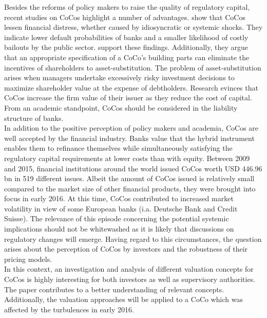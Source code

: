 Besides the reforms of policy makers to raise the quality of regulatory capital, recent studies on CoCos highlight a number of advantages. \citet{albul2015contingent} show that CoCos lessen financial distress, whether caused by idiosyncratic or systemic shocks. They indicate lower default probabilities of banks and a smaller likelihood of costly bailouts by the public sector. \citet{hilscher2014bank} support these findings. Additionally, they argue that an appropriate specification of a CoCo's building parts can eliminate the incentives of shareholders to asset-substitution. The problem of asset-substitution arises when managers undertake excessively risky investment decisions to maximize shareholder value at the expense of debtholders. \citep{bannier2010} Research evinces that CoCos increase the firm value of their issuer as they reduce the cost of capital. \citep{albul2015contingent, von2011contingent, barucci2012countercyclical} From an academic standpoint, CoCos should be considered in the liability structure of banks.\\ 

In addition to the positive perception of policy makers and academia, CoCos are well accepted by the financial industry. Banks value that the hybrid instrument enables them to refinance themselves while simultaneously satisfying the regulatory capital requirements at lower costs than with equity. \citep{europeanparliament2016} Between 2009 and 2015, financial institutions around the world issued CoCos worth USD 446.96 bn in 519 different issues. \citep{avdjiev2015coco} Albeit the amount of CoCos issued is relatively small compared to the market size of other financial products, they were brought into focus in early 2016. At this time, CoCos contributed to increased market volatility in view of some European banks (i.a. Deutsche Bank and Credit Suisse). The relevance of this episode concerning the potential systemic implications should not be whitewashed as it is likely that discussions on regulatory changes will emerge. Having regard to this circumstances, the question arises about the perception of CoCos by investors and the robustness of their pricing models. \citep{europeanparliament2016} \\

In this context, an investigation and analysis of different valuation concepts for CoCos is highly interesting for both investors as well as supervisory authorities. The paper contributes to a better understanding of relevant concepts. Additionally, the valuation approaches will be applied to a CoCo which was affected by the turbulences in early 2016.

